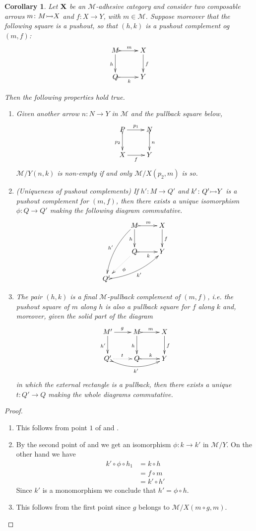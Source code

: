\documentclass[a4paper]{article}
\newcommand{\mto}[0]{\scalebox{1}{$\rightarrowtail$}}
\def\X{\textbf {\textup{X}}}
\newtheorem{corollary}[theorem]{Corollary}
\theoremstyle{definition}
\begin{document}
\begin{corollary}\label{lem:radj} Let $\X$ be an $\mathcal{M}$-adhesive category and consider two composable arrows $m\colon M \mto X$  and $f\colon X\to Y$, with $m\in \mathcal{M}$. Suppose moreover that the following square is a pushout, so that $(h,k)$ is a pushout complement og $(m,f)$:
	\[\xymatrix{M \ar@{>->}[r]^{m}\ar[d]_{h}& X \ar[d]^{f} \\Q\ar@{>->}[r]_{k}&Y}\]
	
Then the following properties hold true.
\begin{enumerate}
	\item  Given another arrow $n\colon N\to Y$ in $\mathcal{M}$ and the pullback square below,
	\[\xymatrix{P \ar[r]^{p_1} \ar@{>->}[d]_{p_2}& N \ar@{>->}[d]^{n}\\X \ar[r]_f&Y}\]
	$\mathcal{M}/Y(n, k)$ is non-empty  if and only $\mathcal{M}/X(p_2, m)$ is so.
	\item (Uniqueness of pushout complements) If $h'\colon M\to Q' $ and $k'\colon Q'\mto Y$ is a pushout complement for $(m,f)$, then there exists a unique isomorphism $\phi\colon Q\to Q'$ making the following diagram commutative.
	\[\xymatrix{&M \ar@{>->}[r]^{m} \ar[d]_{h} \ar@/_.3cm/[ddl]_{h'}& X \ar[d]^{f} \\ &Q \ar@{.>}[dl]^{\phi} \ar@{>->}[r]_{k} & Y \\ Q' \ar@{>->}@/_.3cm/[urr]_{k'}}\]
	\item The pair $(h,k)$ is a \emph{final $\mathcal{M}$-pullback complement} of $(m,f)$, i.e. the pushout square of $m$ along $h$ is also a pullback square for $f$ along $k$ and, moreover, given the solid part of the diagram
	\[\xymatrix{M' \ar[r]^{g}\ar[d]_{h'} & M \ar@{>->}[r]^{m}\ar[d]_{h}& X \ar[d]^{f}  \\  Q' \ar@{.>}[r]^{t} \ar@/_.4cm/@{>->}[rr]_{k'}&Q\ar@{>->}[r]^{k}&Y}\]
	in which the external rectangle is a pullback, then there exists a unique $t\colon Q'\to Q$ making the whole diagrams commutative.
\end{enumerate}
\end{corollary}
\begin{proof}
	\begin{enumerate}
		\item  This follows from point $1$ of  and .
		\item  By the second point  of  and  we get an isomorphism $\phi:k\to k'$ in $\mathcal{M}/Y$. On the other hand we have
		\begin{align*}
			k'\circ \phi \circ  h_1&=k\circ h\\&=f\circ m\\&= k'\circ h'
		\end{align*}
		Since $k'$ is a monomorphism we conclude that $h'=\phi\circ h$.
		\item  This follows from the first point since $g$ belongs to $\mathcal{M}/X(m\circ g, m)$. \qedhere 
	\end{enumerate}
\end{proof}
\end{document}
